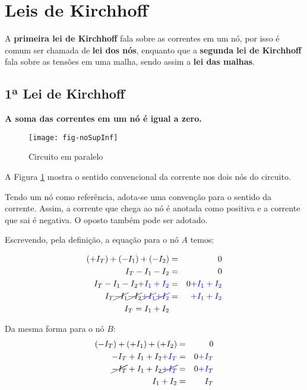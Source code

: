 \section{Leis de Kirchhoff}

A \textbf{primeira lei de Kirchhoff} fala sobre as correntes em um nó, por isso é comum ser chamada de \textbf{lei dos nós}, enquanto que a \textbf{segunda lei de Kirchhoff} fala sobre as tensões em uma malha, sendo assim a \textbf{lei das malhas}.


\subsection{1ª Lei de Kirchhoff}

\textbf{A soma das correntes em um nó é igual a zero.}

\begin{figure}[!h]
	\centering
	\caption{Circuito em paralelo}
	\texttt{[image: fig-noSupInf]}
	\label{fig:nosAeB}
\end{figure}


A Figura \ref{fig:nosAeB} mostra o sentido convencional da corrente nos dois nós do circuito.

Tendo um nó como referência, adota-se uma convenção para o sentido da corrente. Assim, a corrente que chega ao nó é anotada como positiva e a corrente que sai é negativa. O oposto também pode ser adotado.

Escrevendo, pela definição, a equação para o nó $A$ temos:

\begin{eqnarray}
\label{eq:1kirchhoff}
(+I_T) + (-I_1) + (-I_2) & = & 0\\
I_T - I_1 - I_2 & = & 0 \nonumber\\
I_T - I_1 - I_2 \color{blue}{+ I_1 + I_2}& = & 0 \color{blue}{+I_1 + I_2} \nonumber\\
I_T \cancel{-I_1} \cancel{- I_2} \color{blue}{\cancel{+ I_1} \cancel{+ I_2}}& = & \color{blue}{+I_1 + I_2} \nonumber\\
I_T = I_1 + I_2
\end{eqnarray}

Da mesma forma para o nó $B$:
\begin{eqnarray}
(-I_T) + (+I_1) + (+I_2) & = & 0 \nonumber\\
-I_T + I_1 + I_2 \color{blue}{+I_T}& = & 0\color{blue}{+I_T} \nonumber\\
\cancel{-I_T} + I_1 + I_2 \color{blue}{\cancel{+I_T}}& = & 0\color{blue}{+I_T} \nonumber\\
I_1 + I_2 & = & I_T \nonumber
\end{eqnarray}





